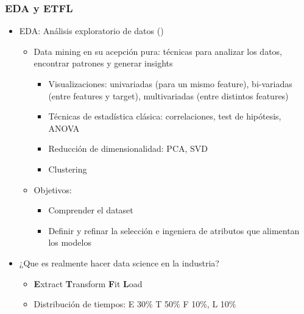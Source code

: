 \documentclass[leqno, 10pt, envcountsect]{beamer}
\numberwithin{equation}{section}
\theoremstyle{definition}
\theoremstyle{example}
\numberwithin{figure}{section}
\numberwithin{table}{section}
\let\olditem\item
\renewcommand{\item}{%
\olditem\vspace{1pt}}
\begin{document}
\begin{frame}[fragile=singleslide]
  \frametitle{EDA y ETFL}
  \begin{itemize}
    \item EDA: Análisis exploratorio de datos  (\textcite{tukey77})
      \begin{itemize}
        \item Data mining en su acepción pura: técnicas para analizar
          los datos, encontrar patrones y generar insights
          \begin{itemize}
            \item Visualizaciones: univariadas (para un mismo feature),
              bi-variadas (entre features y target), multivariadas (entre
              distintos features)
            \item Técnicas de estadística clásica: correlaciones, test de
              hipótesis, ANOVA
            \item Reducción de dimensionalidad: PCA, SVD
            \item Clustering
          \end{itemize}
        \item Objetivos:
          \begin{itemize}
            \item Comprender el dataset
            \item Definir y refinar la selección e ingeniera de atributos que
              alimentan los modelos
          \end{itemize}
      \end{itemize}
  \end{itemize}

  \begin{itemize}
    \item ¿Que es realmente hacer data science en la industria?
      \begin{itemize}
        \item \textbf{E}xtract \textbf{T}ransform \textbf{F}it \textbf{L}oad
        \item Distribución de tiempos: E 30\% T 50\% F 10\%, L 10\%
      \end{itemize}
  \end{itemize}
\end{frame}
\end{document}
